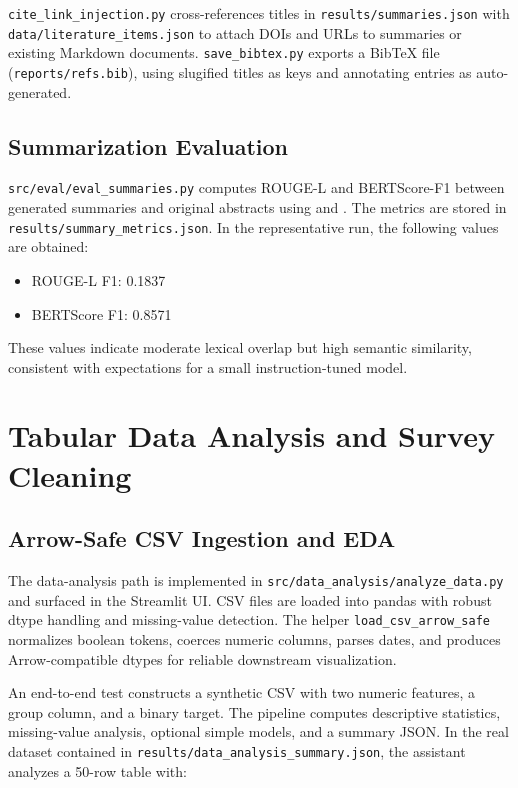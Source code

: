\documentclass[11pt]{article}
\begin{document}
\verb|cite_link_injection.py| cross-references titles in \verb|results/summaries.json| with \verb|data/literature_items.json| to attach DOIs and URLs to summaries or existing Markdown documents. \verb|save_bibtex.py| exports a BibTeX file (\verb|reports/refs.bib|), using slugified titles as keys and annotating entries as auto-generated.

\subsection{Summarization Evaluation}

\verb|src/eval/eval_summaries.py| computes ROUGE-L and BERTScore-F1 between generated summaries and original abstracts using \citet{lin2004rouge} and \citet{zhang2020bertscore}. The metrics are stored in \verb|results/summary_metrics.json|. In the representative run, the following values are obtained:

\begin{itemize}[leftmargin=1.5em]
\item ROUGE-L F1: 0.1837
\item BERTScore F1: 0.8571
\end{itemize}

These values indicate moderate lexical overlap but high semantic similarity, consistent with expectations for a small instruction-tuned model.

\section{Tabular Data Analysis and Survey Cleaning}

\subsection{Arrow-Safe CSV Ingestion and EDA}

The data-analysis path is implemented in \verb|src/data_analysis/analyze_data.py| and surfaced in the Streamlit UI. CSV files are loaded into pandas with robust dtype handling and missing-value detection. The helper \verb|load_csv_arrow_safe| normalizes boolean tokens, coerces numeric columns, parses dates, and produces Arrow-compatible dtypes for reliable downstream visualization.

An end-to-end test constructs a synthetic CSV with two numeric features, a group column, and a binary target. The pipeline computes descriptive statistics, missing-value analysis, optional simple models, and a summary JSON. In the real dataset contained in \verb|results/data_analysis_summary.json|, the assistant analyzes a 50-row table with:
\end{document}
